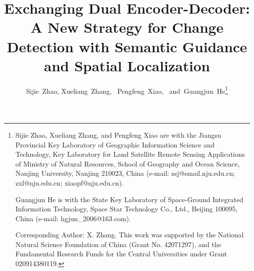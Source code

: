 \documentclass[journal]{IEEEtran}
\begin{document}
\def\UrlFont{\em}

\title{Exchanging Dual Encoder-Decoder: A New Strategy for Change Detection with Semantic Guidance and Spatial Localization}

\author{Sijie~Zhao,
        Xueliang~Zhang,~
        Pengfeng~Xiao,~
        and~Guangjun~He\thanks{Sijie Zhao, Xueliang Zhang, and Pengfeng Xiao are with the Jiangsu Provincial Key Laboratory of Geographic
Information Science and Technology, Key Laboratory for Land Satellite Remote Sensing Applications of Ministry of Natural Resources, School of Geography and Ocean Science, Nanjing University, Nanjing 210023, China (e-mail: zsj@smail.nju.edu.cn; zxl@nju.edu.cn; xiaopf@nju.edu.cn).

Guangjun He is with the State Key Laboratory of Space-Ground Integrated
Information Technology, Space Star Technology Co., Ltd., Beijing 100095,
China (e-mail: hgjun\_2006@163.com).

Corresponding Author: X. Zhang. This work was supported by the National Natural Science Foundation of China (Grant No. 42071297), and the Fundamental Research Funds for the Central Universities under Grant 020914380119.

}
}

\maketitle
\end{document}
